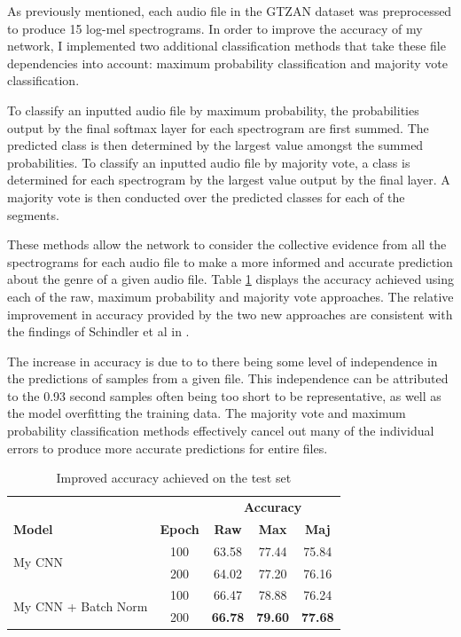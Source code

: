 \documentclass[conference]{IEEEtran}
\begin{document}
As previously mentioned, each audio file in the GTZAN \cite{TzanetakisCook} dataset was preprocessed to produce 15 log-mel spectrograms.
In order to improve the accuracy of my network, I implemented two additional classification methods that take these file dependencies into account: maximum probability classification and majority vote classification.

To classify an inputted audio file by maximum probability, the probabilities output by the final softmax layer for each spectrogram are first summed.
The predicted class is then determined by the largest value amongst the summed probabilities.
To classify an inputted audio file by majority vote, a class is determined for each spectrogram by the largest value output by the final layer.
A majority vote is then conducted over the predicted classes for each of the segments.

These methods allow the network to consider the collective evidence from all the spectrograms for each audio file to make a more informed and accurate prediction about the genre of a given audio file. 
Table \ref{improved_results} displays the accuracy achieved using each of the raw, maximum probability and majority vote approaches.
The relative improvement in accuracy provided by the two new approaches are consistent with the findings of Schindler et al in \cite{SchindlerLidyRauber}.

The increase in accuracy is due to to there being some level of independence in the predictions of samples from a given file.
This independence can be attributed to the 0.93 second samples often being too short to be representative, as well as the model overfitting the training data.
The majority vote and maximum probability classification methods effectively cancel out many of the individual errors to produce more accurate predictions for entire files.

\begin{table}[htbp]
    \caption{Improved accuracy achieved on the test set}
    \begin{center}
    \begin{tabular}{l c c c c}
    \toprule
    &&\multicolumn{3}{c}{\textbf{Accuracy}}\\
    \cmidrule(lr){3-5}
    \textbf{Model}&\textbf{Epoch}&\textbf{Raw}&\textbf{Max}&\textbf{Maj}\\
    \midrule
    \multirow{ 2}{*}{My CNN} & 100 & 63.58 & 77.44 & 75.84 \\
    & 200 & 64.02 & 77.20 & 76.16 \\
    \midrule
    \multirow{ 2}{*}{My CNN + Batch Norm} & 100 & 66.47 & 78.88 & 76.24 \\
    & 200 & \textbf{66.78} & \textbf{79.60} & \textbf{77.68} \\
    \bottomrule
    \end{tabular}
    \label{improved_results}
    \end{center}
\end{table}
\end{document}
